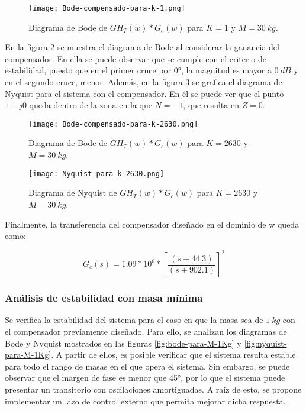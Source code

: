 \begin{figure}[H]
	\centering
	\texttt{[image: Bode-compensado-para-k-1.png]}
	\caption{Diagrama de Bode de $GH_T(w)*G_c(w)$ para $K=1$ y $M=30\:kg$.}
	\label{fig:bode-compensado-para-k-1}
\end{figure}
 
En la figura \ref{fig:bode-compensado-para-k-2630} se muestra el diagrama de Bode al considerar la ganancia del compensador. En ella se puede observar que se  cumple con el criterio de estabilidad, puesto que en el primer cruce por 0°, la magnitud es mayor a $0\:dB$ y en el segundo cruce, menor. Además, en la figura \ref{fig:nyquist-para-k-2630} se grafica el diagrama de Nyquist para el sistema con el compensador. En él se puede ver que el punto $1+j0$ queda dentro de la zona en la que $N=-1$, que resulta en $Z=0$.

\begin{figure}[H]
	\centering
	\texttt{[image: Bode-compensado-para-k-2630.png]}
	\caption{Diagrama de Bode de $GH_T(w)*G_c(w)$ para $K=2630$ y $M=30\:kg$.}
	\label{fig:bode-compensado-para-k-2630}
\end{figure}

\begin{figure}[H]
	\centering
	\texttt{[image: Nyquist-para-k-2630.png]}
	\caption{Diagrama de Nyquist de $GH_T(w)*G_c(w)$ para $K=2630$ y $M=30\:kg$.}
	\label{fig:nyquist-para-k-2630}
\end{figure}

Finalmente, la transferencia del compensador diseñado en el dominio de w queda como:

\begin{equation}  
	G_c(s)=1.09*10^6*{[\frac{(s+44.3)}{(s+902.1)}]}^2
	\label{eq:transferencia-del-compensador_dig_final}
\end{equation} 


\subsubsection{Análisis de estabilidad con masa mínima}


Se verifica la estabilidad del sistema  para el caso en que la masa sea de $1\:kg$ con el compensador previamente diseñado. Para ello, se analizan los diagramas de Bode y Nyquist mostrados en las figuras \ref{fig:bode-para-M-1Kg} y \ref{fig:nyquist-para-M-1Kg}. A partir de ellos, es posible verificar que el sistema resulta estable para todo el rango de masas en el que opera el sistema. Sin embargo, se puede observar que el margen de fase es menor que 45°, por lo que el sistema puede presentar un transitorio con oscilaciones amortiguadas. A raíz de esto, se propone implementar un lazo de control externo que permita mejorar dicha respuesta.


